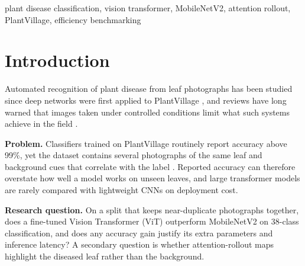 \documentclass[conference]{IEEEtran}
\begin{document}
\begin{IEEEkeywords}
plant disease classification, vision transformer, MobileNetV2, attention rollout, PlantVillage, efficiency benchmarking
\end{IEEEkeywords}

\section{Introduction}
Automated recognition of plant disease from leaf photographs has been studied since deep networks were first applied to PlantVillage \cite{mohanty2016,ferentinos2018}, and reviews have long warned that images taken under controlled conditions limit what such systems achieve in the field \cite{barbedo2016}.

\textbf{Problem.} Classifiers trained on PlantVillage routinely report accuracy above 99\%, yet the dataset contains several photographs of the same leaf and background cues that correlate with the label \cite{noyan2022bias}. Reported accuracy can therefore overstate how well a model works on unseen leaves, and large transformer models are rarely compared with lightweight CNNs on deployment cost.

\textbf{Research question.} On a split that keeps near-duplicate photographs together, does a fine-tuned Vision Transformer (ViT) \cite{dosovitskiy2021vit} outperform MobileNetV2 \cite{sandler2018mobilenetv2} on 38-class classification, and does any accuracy gain justify its extra parameters and inference latency? A secondary question is whether attention-rollout maps \cite{abnar2020rollout} highlight the diseased leaf rather than the background.
\end{document}
